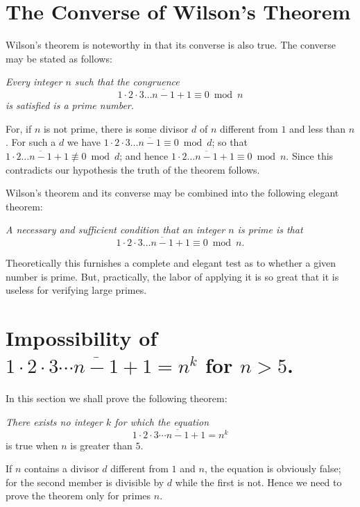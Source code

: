 \documentclass[oneside]{book}
\begin{document}
\section{The Converse of Wilson's Theorem}\label{s26}

Wilson's theorem is noteworthy in that its converse is also true.
The converse may be stated as follows:

\smallskip \emph{Every integer $n$ such that the congruence}
\begin{equation*}
1 \cdot 2 \cdot 3 \ldots \overline{n-1} + 1 \equiv 0 \bmod n
\end{equation*}
\emph{is satisfied is a prime number.}

For, if $n$ is not prime, there is some divisor $d$ of $n$ different
from $1$ and less than $n$. For such a $d$ we have $1 \cdot 2 \cdot
3 \ldots \overline{n-1} \equiv 0 \bmod d$; so that $1 \cdot 2 \ldots
\overline{n-1}+1 \not\equiv 0 \bmod d$; and hence $1 \cdot 2 \ldots
\overline{n-1}+1 \equiv 0 \bmod n$. Since this contradicts our
hypothesis the truth of the theorem follows.

\smallskip Wilson's theorem and its converse may be combined into
the following elegant theorem:

\smallskip \emph{A necessary and sufficient condition that an
integer $n$ is prime is that}
\begin{equation*}
1 \cdot 2 \cdot 3 \ldots \overline{n-1} + 1 \equiv 0 \bmod n.
\end{equation*}

Theoretically this furnishes a complete and elegant test as to
whether a given number is prime. But, practically, the labor of
applying it is so great that it is useless for verifying large
primes.

\section{Impossibility of $1 \cdot 2 \cdot 3 \cdots
\overline{n-1} + 1 = n^k$ for $n > 5$.}\label{s27}

In this section we shall prove the following theorem:

\emph{There exists no integer $k$ for which the equation}
\begin{equation*}
1 \cdot 2 \cdot 3 \cdots \overline{n-1} + 1 = n^k
\end{equation*}
is true when $n$ is greater than $5$.

If $n$ contains a divisor $d$ different from $1$ and $n$, the
equation is obviously false; for the second member is divisible by
$d$ while the first is not. Hence we need to prove the theorem only
for primes $n$.
\end{document}
